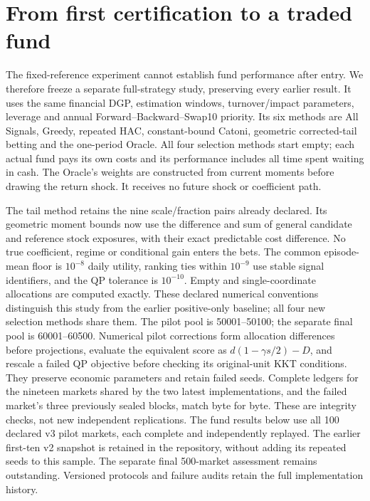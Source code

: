 \section{From first certification to a traded fund}
\label{sec:full-strategy}
The fixed-reference experiment cannot establish fund performance after entry.
We therefore freeze a separate full-strategy study, preserving every earlier
result. It uses the same financial DGP, estimation windows, turnover/impact
parameters, leverage and annual Forward--Backward--Swap10 priority. Its six
methods are All Signals, Greedy, repeated HAC, constant-bound Catoni, geometric
corrected-tail betting and the one-period Oracle. All four selection methods
start empty; each actual fund pays its own costs and its performance includes
all time spent waiting in cash. The Oracle's weights are constructed from
current moments before drawing the return shock. It receives no future shock
or coefficient path.

The tail method retains the nine scale/fraction pairs already declared. Its
geometric moment bounds now use the difference and sum of general candidate
and reference stock exposures, with their exact predictable cost difference.
No true coefficient, regime or conditional gain enters the bets. The common
episode-mean floor is $10^{-8}$ daily utility, ranking ties within $10^{-9}$
use stable signal identifiers, and the QP tolerance is $10^{-10}$. Empty and
single-coordinate allocations are computed exactly. These declared numerical
conventions distinguish this study from the earlier positive-only baseline;
all four new selection methods share them. The pilot pool is 50001--50100;
the separate final pool is 60001--60500. Numerical pilot corrections form
allocation differences before projections, evaluate the equivalent score as
$d(1-\gamma s/2)-D$, and rescale a failed QP objective before checking its
original-unit KKT conditions. They preserve economic parameters and retain
failed seeds. Complete ledgers for the nineteen markets shared by the two
latest implementations, and the failed market's three previously sealed
blocks, match byte for byte. These are integrity checks, not new independent
replications. The fund results below use all 100 declared v3 pilot markets,
each complete and independently replayed. The earlier first-ten v2 snapshot
is retained in the repository, without adding its repeated seeds to this
sample. The separate final 500-market assessment remains outstanding.
Versioned protocols and failure audits retain the full implementation history.

